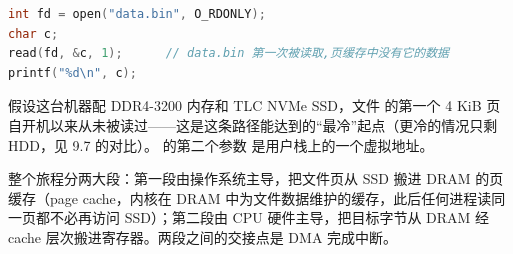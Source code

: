 \begin{lstlisting}[language=C]
int fd = open("data.bin", O_RDONLY);
char c;
read(fd, &c, 1);      // data.bin 第一次被读取,页缓存中没有它的数据
printf("%d\n", c);
\end{lstlisting}

假设这台机器配 DDR4-3200 内存和 TLC NVMe SSD，文件  的第一个 4 KiB 页自开机以来从未被读过——这是这条路径能达到的“最冷”起点（更冷的情况只剩 HDD，见 9.7 的对比）。 的第二个参数  是用户栈上的一个虚拟地址。

整个旅程分两大段：第一段由操作系统主导，把文件页从 SSD 搬进 DRAM 的页缓存（page cache，内核在 DRAM 中为文件数据维护的缓存，此后任何进程读同一页都不必再访问 SSD）；第二段由 CPU 硬件主导，把目标字节从 DRAM 经 cache 层次搬进寄存器。两段之间的交接点是 DMA 完成中断。

